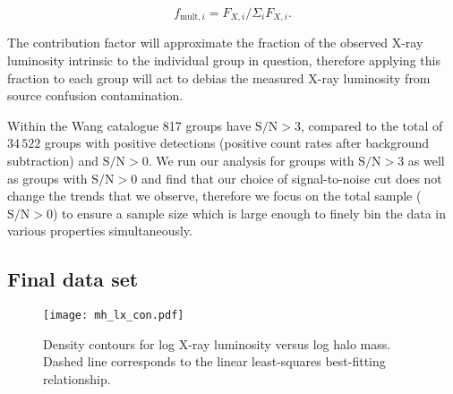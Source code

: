\begin{equation}
  f_{\mathrm{mult},i} = F_{X,i} / \Sigma_i F_{X,i}.
\end{equation}

\noindent
The contribution factor will approximate the fraction of the observed
X-ray luminosity intrinsic to the individual group in question,
therefore applying this fraction to each group will act to debias the
measured X-ray luminosity from source confusion contamination.
\par
Within the Wang catalogue 817 groups have $\mathrm{S/N} > 3$, compared
to the total of $34\,522$ groups with positive detections (positive
count rates after background subtraction) and $\mathrm{S/N} > 0$.  We
run our analysis for groups with $\mathrm{S/N} > 3$ as well as groups
with $\mathrm{S/N} > 0$ and find that our choice of signal-to-noise
cut does not change the trends that we observe, therefore we focus on
the total sample ($\mathrm{S/N} > 0$) to ensure a sample size which is
large enough to finely bin the data in various properties
simultaneously.

\subsection{Final data set}

\begin{figure}[!tp]
  \centering
  \texttt{[image: mh\_lx\_con.pdf]}
  \caption[X-ray luminosity versus halo mass]{Density contours for log
    X-ray luminosity versus log halo 
    mass.  Dashed line corresponds to the linear least-squares
    best-fitting relationship.}
  \label{fig:mh_lx_con}
\end{figure}

